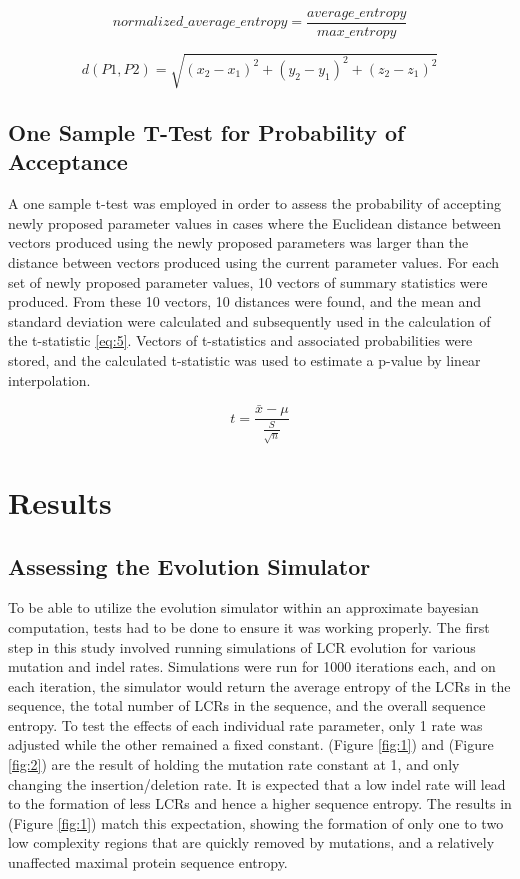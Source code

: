 \documentclass{article}
\providecommand{\figref}[1]{(Figure \ref{#1})}  %
\begin{document}
\begin{equation}
	normalized\_average\_entropy = \frac{average\_entropy}{max\_entropy}
	\label{eq:3}
\end{equation}

\begin{equation}
	d(P1,P2) = \sqrt{(x_2-x_1)^2 + (y_2-y_1)^2 + (z_2-z_1)^2 }
	\label{eq:4}
\end{equation}

\subsection{One Sample T-Test for Probability of Acceptance}

A one sample t-test was employed in order to assess the probability of accepting newly proposed parameter values in cases where the Euclidean distance between vectors produced using the newly proposed parameters was larger than the distance between vectors produced using the current parameter values. For each set of newly proposed parameter values, 10 vectors of summary statistics were produced. From these 10 vectors, 10 distances were found, and the mean and standard deviation were calculated and subsequently used in the calculation of the t-statistic \eqref{eq:5}. Vectors of t-statistics and associated probabilities were stored, and the calculated t-statistic was used to estimate a p-value by linear interpolation.

\begin{equation}
	t = \frac{\bar{x}-\mu}{\frac{S}{\sqrt{n}}}
	\label{eq:5}
\end{equation}

\section{Results}

\subsection{Assessing the Evolution Simulator}

To be able to utilize the evolution simulator within an approximate bayesian computation, tests had to be done to ensure it was working properly. The first step in this study involved running simulations of LCR evolution for various mutation and indel rates. Simulations were run for 1000 iterations each, and on each iteration, the simulator would return the average entropy of the LCRs in the sequence, the total number of LCRs in the sequence, and the overall sequence entropy. To test the effects of each individual rate parameter, only 1 rate was adjusted while the other remained a fixed constant. \figref{fig:1} and \figref{fig:2} are the result of holding the mutation rate constant at 1, and only changing the insertion/deletion rate. It is expected that a low indel rate will lead to the formation of less LCRs and hence a higher sequence entropy. The results in \figref{fig:1} match this expectation, showing the formation of only one to two low complexity regions that are quickly removed by mutations, and a relatively unaffected maximal protein sequence entropy. 
\end{document}
